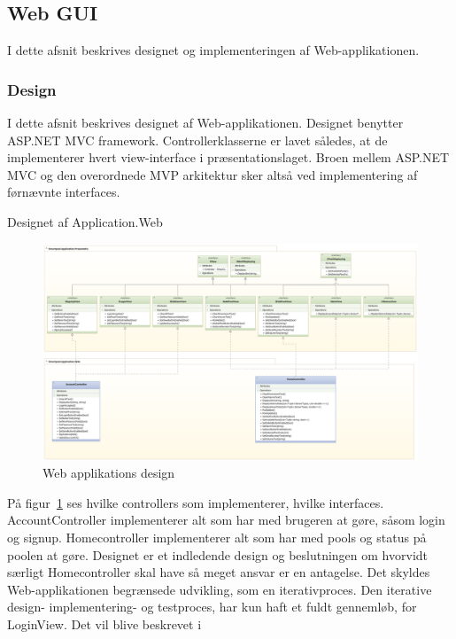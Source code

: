 \subsection{Web GUI}
I dette afsnit beskrives designet og implementeringen af Web-applikationen.

\subsubsection{Design}
I dette afsnit beskrives designet af Web-applikationen. Designet benytter ASP.NET MVC framework. Controllerklasserne er lavet således, at de implementerer hvert view-interface i præsentationslaget. Broen mellem ASP.NET MVC og den overordnede MVP arkitektur sker altså ved implementering af førnævnte interfaces.

Designet af Application.Web
\begin{landscape}
\begin{figure}
	\centering
	\includegraphics[width=1\linewidth]{figs/design/application_web}
	\caption{Web applikations design}
	\label{fig:web_class}
\end{figure}
\end{landscape}
På figur~\ref{fig:web_class} ses hvilke controllers som implementerer, hvilke interfaces. AccountController implementerer alt som har med brugeren at gøre, såsom login og signup. Homecontroller implementerer alt som har med pools og status på poolen at gøre. Designet er et indledende design og beslutningen om hvorvidt særligt Homecontroller skal have så meget ansvar er en antagelse. Det skyldes Web-applikationen begrænsede udvikling, som en iterativproces. Den iterative design- implementering- og testproces, har kun haft et fuldt gennemløb, for LoginView. Det vil blive beskrevet i 

